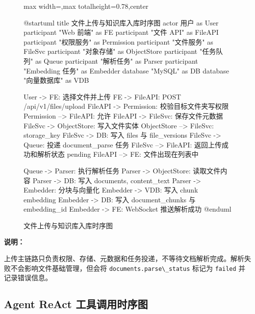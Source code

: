 \documentclass[a4paper,zihao=-4]{ctexart}
\providecommand{\passthrough}[1]{#1}
\begin{document}
\begin{figure}[H]
\centering
\begin{adjustbox}{max width=\linewidth,max totalheight=0.78\textheight,center}
\begingroup
\renewcommand{\PlantUMLJobname}{plantuml-diagrams/req-uml-04}
\begin{plantuml}
@startuml
title 文件上传与知识库入库时序图
actor 用户 as User
participant "Web 前端" as FE
participant "文件 API" as FileAPI
participant "权限服务" as Permission
participant "文件服务" as FileSvc
participant "对象存储" as ObjectStore
participant "任务队列" as Queue
participant "解析任务" as Parser
participant "Embedding 任务" as Embedder
database "MySQL" as DB
database "向量数据库" as VDB

User -> FE: 选择文件并上传
FE -> FileAPI: POST /api/v1/files/upload
FileAPI -> Permission: 校验目标文件夹写权限
Permission --> FileAPI: 允许
FileAPI -> FileSvc: 保存文件元数据
FileSvc -> ObjectStore: 写入文件实体
ObjectStore --> FileSvc: storage_key
FileSvc -> DB: 写入 files 与 file_versions
FileSvc -> Queue: 投递 document_parse 任务
FileSvc --> FileAPI: 返回上传成功和解析状态 pending
FileAPI --> FE: 文件出现在列表中

Queue -> Parser: 执行解析任务
Parser -> ObjectStore: 读取文件内容
Parser -> DB: 写入 documents, content_text
Parser -> Embedder: 分块与向量化
Embedder -> VDB: 写入 chunk embedding
Embedder -> DB: 写入 document_chunks 与 embedding_id
Embedder -> FE: WebSocket 推送解析成功
@enduml
\end{plantuml}
\endgroup
\end{adjustbox}
\caption{文件上传与知识库入库时序图}
\end{figure}

\textbf{说明：}

上传主链路只负责权限、存储、元数据和任务投递，不等待文档解析完成。解析失败不会影响文件基础管理，但会将
\passthrough{\lstinline!documents.parse\_status!} 标记为
\passthrough{\lstinline!failed!} 并记录错误信息。

\hypertarget{agent-react-ux5de5ux5177ux8c03ux7528ux65f6ux5e8fux56fe}{%
\subsection{Agent ReAct
工具调用时序图}\label{agent-react-ux5de5ux5177ux8c03ux7528ux65f6ux5e8fux56fe}}
\end{document}
